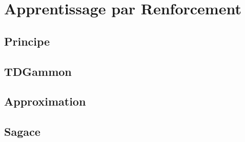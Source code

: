 \section{Apprentissage par Renforcement}
\label{sec:AR}


\subsection{Principe}
\label{sec:AR:principe}



\subsection{TDGammon}
\label{sec:AR:TDGammon}


\subsection{Approximation}
\label{sec:AR:approximation}


\subsection{Sagace}
\label{sec:AR:Sagace}

